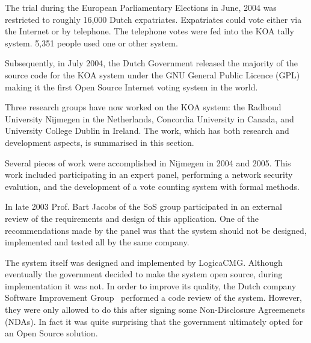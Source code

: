 \documentclass[times, 10pt, twocolumn]{article}
\begin{document}

The trial during the European Parliamentary Elections in June, 2004 was 
restricted to roughly 16,000 Dutch expatriates. Expatriates could vote either 
via the Internet or by telephone. The telephone votes were fed into the KOA 
tally system. 5,351 people used one or other system.

Subsequently, in July 2004, the Dutch Government released the majority of the 
source code for the KOA system under the GNU General Public Licence (GPL) 
making it the first Open Source Internet voting system in the world.
\label{sec:academic-past-work}

Three research groups have now worked on the KOA system: the Radboud University 
Nijmegen in the Netherlands, Concordia University in Canada, and University 
College Dublin in Ireland.  The work, which has both research and development 
aspects, is summarised in this section.


Several pieces of work were accomplished in Nijmegen in 2004 and 2005.
This work included participating in an expert panel, performing a
network security evalution, and the development of a vote counting
system with formal methods.


In late 2003 Prof. Bart Jacobs of the SoS group participated in an
external review of the requirements and design of this
application. One of the recommendations made by the panel was that the
system should not be designed, implemented and tested all by the same
company.

The system itself was designed and implemented by LogicaCMG.  Although
eventually the government decided to make the system open source,
during implementation it was not.  In order to improve its quality, the
Dutch company Software Improvement Group~\cite{SIG} performed a
code review of the system. However, they were only allowed to do this after
signing some Non-Disclosure Agreemenets (NDAs).  In fact it was quite surprising
that the government ultimately opted for an Open Source solution.
\end{document}
